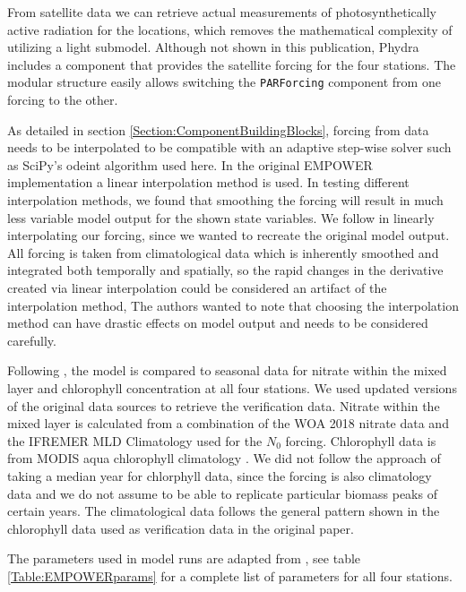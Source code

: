 \documentclass[journal abbreviation, manuscript]{copernicus}
\begin{document}
From satellite data we can retrieve actual measurements of photosynthetically active radiation for the locations, which removes the mathematical complexity of utilizing a light submodel. 
Although not shown in this publication, Phydra includes a component that provides the satellite forcing for the four stations. The modular structure easily allows switching the \texttt{PARForcing} component from one forcing to the other.

As detailed in section \ref{Section:ComponentBuildingBlocks}, forcing from data needs to be interpolated to be compatible with an adaptive step-wise solver such as SciPy's odeint algorithm used here. In the original EMPOWER implementation a linear interpolation method is used. In testing different interpolation methods, we found that smoothing the forcing will result in much less variable model output for the shown state variables. We follow \citet{Anderson2015c} in linearly interpolating our forcing, since we wanted to recreate the original model output. All forcing is taken from climatological data which is inherently smoothed and integrated both temporally and spatially, so the rapid changes in the derivative created via linear interpolation could be considered an artifact of the interpolation method, The authors wanted to note that choosing the interpolation method can have drastic effects on model output and needs to be considered carefully.


Following \citet{Anderson2015c}, the model is compared to seasonal data for nitrate within the mixed layer and chlorophyll concentration at all four stations. We used updated versions of the original data sources to retrieve the verification data. Nitrate within the mixed layer is calculated from a combination of the WOA 2018 nitrate data and the IFREMER MLD Climatology used for the $N_0$ forcing. Chlorophyll data is from MODIS aqua chlorophyll climatology \citep{NASAGoddardSpaceFlightCenterOceanEcologyLaboratoryOceanBiologyProcessingGroup}. We did not follow the approach of taking a median year for chlorphyll data, since the forcing is also climatology data and we do not assume to be able to replicate particular biomass peaks of certain years. The climatological data follows the general pattern shown in the chlorophyll data used as verification data in the original paper.


The parameters used in model runs are adapted from \citet{Anderson2015c}, see table \ref{Table:EMPOWERparams} for a complete list of parameters for all four stations.
\end{document}
